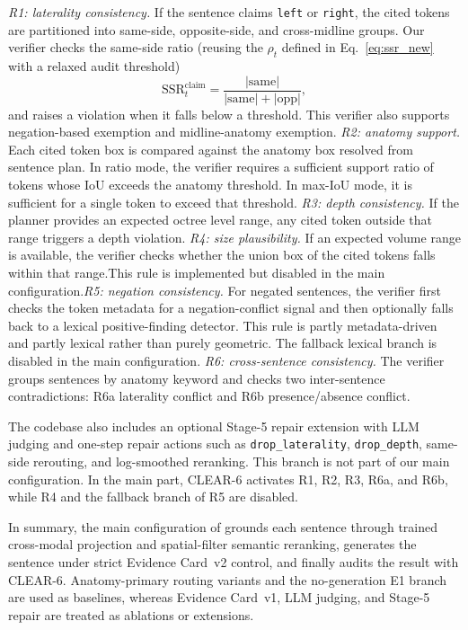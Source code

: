 \emph{R1: laterality consistency.} If the sentence claims \texttt{left} or \texttt{right}, the cited tokens are partitioned into same-side, opposite-side, and cross-midline groups. Our verifier checks the same-side ratio (reusing the $\rho_t$ defined in Eq.~\eqref{eq:ssr_new} with a relaxed audit threshold)
\begin{equation}
\mathrm{SSR}_t^{\mathrm{claim}}
=
\frac{|\mathrm{same}|}{|\mathrm{same}|+|\mathrm{opp}|},
\label{eq:r1_new}
\end{equation}
and raises a violation when it falls below a threshold. This verifier also supports negation-based exemption and midline-anatomy exemption. \emph{R2: anatomy support.} Each cited token box is compared against the anatomy box resolved from sentence plan. In ratio mode, the verifier requires a sufficient support ratio of tokens whose IoU exceeds the anatomy threshold. In max-IoU mode, it is sufficient for a single token to exceed that threshold. \emph{R3: depth consistency.} If the planner provides an expected octree level range, any cited token outside that range triggers a depth violation. \emph{R4: size plausibility.} If an expected volume range is available, the verifier checks whether the union box of the cited tokens falls within that range.This rule is implemented but disabled in the main configuration.\emph{R5: negation consistency.} For negated sentences, the verifier first checks the token metadata for a negation-conflict signal and then optionally falls back to a lexical positive-finding detector. This rule is partly metadata-driven and partly lexical rather than purely geometric. The fallback lexical branch is disabled in the main configuration. \emph{R6: cross-sentence consistency.} The verifier groups sentences by anatomy keyword and checks two inter-sentence contradictions: R6a laterality conflict and R6b presence/absence conflict.

The codebase also includes an optional Stage-5 repair extension with LLM judging and one-step repair actions such as \texttt{drop\_laterality}, \texttt{drop\_depth}, same-side rerouting, and log-smoothed reranking. This branch is not part of our main configuration. In the main part, \textsc{CLEAR}-6 activates R1, R2, R3, R6a, and R6b, while R4 and the fallback branch of R5 are disabled.





In summary, the main configuration of \method{} grounds each sentence through trained cross-modal projection and spatial-filter semantic reranking, generates the sentence under strict Evidence Card~v2 control, and finally audits the result with \textsc{CLEAR}-6. Anatomy-primary routing variants and the no-generation E1 branch are used as baselines, whereas Evidence Card~v1, LLM judging, and Stage-5 repair are treated as ablations or extensions.



